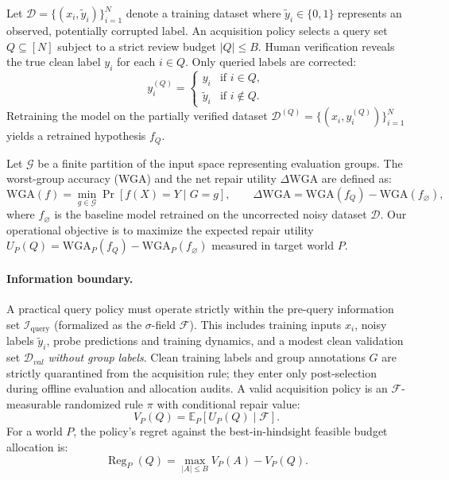 \documentclass{article}
\newcommand{\dwga}{\ensuremath{\Delta\mathrm{WGA}}}
\newcommand{\wga}{\ensuremath{\mathrm{WGA}}}
\begin{document}
Let $\mathcal D=\{(x_i,\tilde y_i)\}_{i=1}^N$ denote a training dataset where $\tilde y_i \in \{0, 1\}$ represents an observed, potentially corrupted label. An acquisition policy selects a query set $Q\subseteq[N]$ subject to a strict review budget $|Q|\le B$. Human verification reveals the true clean label $y_i$ for each $i\in Q$. Only queried labels are corrected:
\begin{equation}
  y_i^{(Q)} = \begin{cases} y_i & \text{if } i \in Q, \\ \tilde y_i & \text{if } i \notin Q. \end{cases}
\end{equation}
Retraining the model on the partially verified dataset $\mathcal D^{(Q)} = \{(x_i, y_i^{(Q)})\}_{i=1}^N$ yields a retrained hypothesis $f_Q$.

Let $\mathcal G$ be a finite partition of the input space representing evaluation groups. The worst-group accuracy (WGA) and the net repair utility $\dwga$ are defined as:
\begin{equation}
  \wga(f)=\min_{g\in\mathcal G}\Pr[f(X)=Y\mid G=g],\qquad
  \dwga=\wga(f_Q)-\wga(f_{\varnothing}),
  \label{eq:wga}
\end{equation}
where $f_{\varnothing}$ is the baseline model retrained on the uncorrected noisy dataset $\mathcal D$. Our operational objective is to maximize the expected repair utility $U_P(Q)=\wga_P(f_Q)-\wga_P(f_{\varnothing})$ measured in target world $P$.

\paragraph{Information boundary.}
A practical query policy must operate strictly within the pre-query information set $\mathcal{I}_{\text{query}}$ (formalized as the $\sigma$-field $\mathcal F$). This includes training inputs $x_i$, noisy labels $\tilde y_i$, probe predictions and training dynamics, and a modest clean validation set $\mathcal D_{val}$ \emph{without group labels}. Clean training labels and group annotations $G$ are strictly quarantined from the acquisition rule; they enter only post-selection during offline evaluation and allocation audits. A valid acquisition policy is an $\mathcal F$-measurable randomized rule $\pi$ with conditional repair value:
\begin{equation}
  V_P(Q)=\mathbb E_P[U_P(Q)\mid\mathcal F].
  \label{eq:value}
\end{equation}
For a world $P$, the policy's regret against the best-in-hindsight feasible budget allocation is:
\begin{equation}
  \operatorname{Reg}_P(Q)=\max_{|A|\le B}V_P(A)-V_P(Q).
  \label{eq:regret}
\end{equation}
\end{document}
